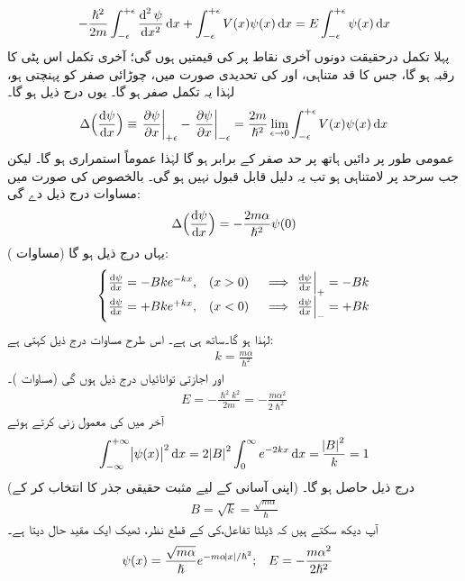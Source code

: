 \begin{align}
-\frac{\hslash^2}{2m}\int_{-\epsilon}^{+\epsilon}\frac{\dif^{\,2}\psi}{\dif x^2}\dif x+\int_{-\epsilon}^{+\epsilon}V(x)\psi(x)\dif x=E\int_{-\epsilon}^{+\epsilon}\psi(x)\dif x
\end{align}
پہلا تکمل درحقیقت دونوں آخری نقاط پر  کی قیمتیں ہوں گی؛ آخری تکمل اس پٹی کا رقبہ ہو گا، جس کا قد متناہی، اور  کی تحدیدی صورت میں، چوڑائی صفر کو پہنچتی ہو، لہٰذا یہ تکمل صفر ہو گا۔ یوں درج ذیل ہو گا۔
\begin{align}
\Delta\Big(\frac{\dif\psi}{\dif x}\Big)\equiv \left.\frac{\partial \psi}{\partial x}\right|_{+\epsilon}-\left.\frac{\partial \psi}{\partial x}\right|_{-\epsilon}=\frac{2m}{\hslash^2}\lim_{\epsilon\to0}\int_{-\epsilon}^{+\epsilon}V(x)\psi(x)\dif x
\end{align}
 عمومی طور پر دائیں ہاتھ پر حد صفر کے برابر ہو گا لہٰذا  عموماً استمراری ہو گا۔ لیکن جب سرحد پر  لامتناہی ہو تب یہ دلیل قابل قبول نہیں ہو گی۔ بالخصوص  کی صورت میں مساوات  درج ذیل دے گی: 
\begin{align}\label{مساوات_شروڈنگر_مبدا_پر_تفرقات_کا_فرق}
\Delta\Big(\frac{\dif \psi}{\dif x}\Big)=-\frac{2m\alpha}{\hslash^2}\psi(0)
\end{align}
یہاں درج ذیل ہو گا (مساوات ):
\begin{align*}
\begin{cases}
\frac{\dif \psi}{\dif x}=-Bke^{-kx},&(x>0)\quad \implies \left.\frac{\dif\psi}{\dif x}\right|_{+}=-Bk\\
\frac{\dif \psi}{\dif x}=+Bke^{+kx},&(x<0)\quad \implies \left.\frac{\dif\psi}{\dif x}\right|_{-}=+Bk
\end{cases}
\end{align*}
لہٰذا  ہو گا۔ساتھ ہی  ہے۔ اس طرح مساوات  درج ذیل کہتی ہے:
\begin{align}
k=\frac{m\alpha}{\hslash^2 }
\end{align}
اور اجازتی توانائیاں درج ذیل ہوں گی (مساوات )۔
\begin{align}
E=-\frac{\hslash^2 k^2}{2m}=-\frac{m\alpha^2}{2\hslash^2}
\end{align}
 آخر میں  کی معمول زنی کرتے    ہوئے 
\begin{align*}
\int_{-\infty}^{+\infty}\abs{\psi(x)}^2\dif x=2\abs{B}^2\int_0^{\infty}e^{-2kx}\dif x=\frac{\abs{B}^2}{k}=1
\end{align*}
 (اپنی آسانی کے لیے مثبت حقیقی جذر کا انتخاب کر کے) درج ذیل حاصل ہو گا۔
\begin{align}
B=\sqrt{k}=\frac{\sqrt{m\alpha}}{\hslash}
\end{align}
آپ دیکھ سکتے ہیں کہ ڈیلٹا تفاعل،کی   کے قطع نظر، ٹھیک ایک مقید حال دیتا ہے۔ 
\begin{align}\label{مساوات_شروڈنگر_مقید_حال_ڈیلٹا}
\psi(x)&=\frac{\sqrt{m\alpha}}{\hslash}e^{-m\alpha\abs{x}/\hslash^2};&&E=-\frac{m\alpha^2}{2\hslash^2}
\end{align}

